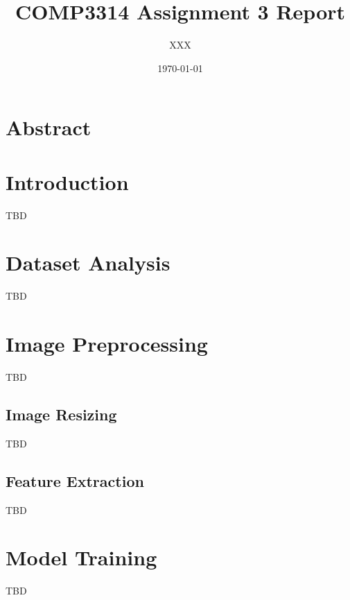 \documentclass[a4paper,11pt]{article}
\title{COMP3314 Assignment 3 Report}
\author{XXX}
\date{\today}
\begin{document}
\maketitle

\tableofcontents\newpage

\section*{Abstract}

\section{Introduction}
TBD

\section{Dataset Analysis}
TBD

\section{Image Preprocessing}
TBD

\subsection{Image Resizing}
TBD

\subsection{Feature Extraction}
TBD

\section{Model Training}
TBD
\end{document}
